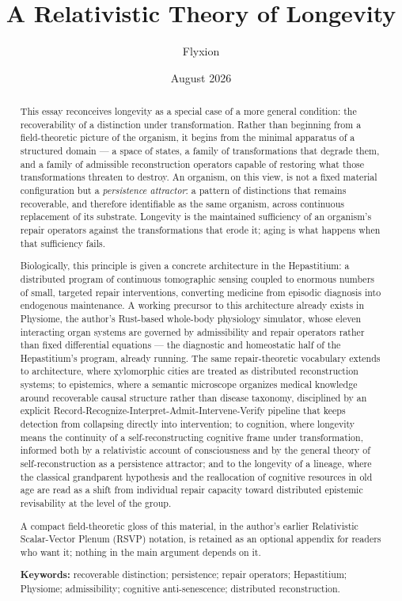 \documentclass[12pt]{article}
\title{A Relativistic Theory of Longevity}
\author{Flyxion}
\date{August 2026}
\begin{document}
\maketitle

\begin{abstract}
This essay reconceives longevity as a special case of a more general condition: the recoverability of a distinction under transformation. Rather than beginning from a field-theoretic picture of the organism, it begins from the minimal apparatus of a structured domain --- a space of states, a family of transformations that degrade them, and a family of admissible reconstruction operators capable of restoring what those transformations threaten to destroy. An organism, on this view, is not a fixed material configuration but a \emph{persistence attractor}: a pattern of distinctions that remains recoverable, and therefore identifiable as the same organism, across continuous replacement of its substrate. Longevity is the maintained sufficiency of an organism's repair operators against the transformations that erode it; aging is what happens when that sufficiency fails.

Biologically, this principle is given a concrete architecture in the Hepastitium: a distributed program of continuous tomographic sensing coupled to enormous numbers of small, targeted repair interventions, converting medicine from episodic diagnosis into endogenous maintenance. A working precursor to this architecture already exists in Physiome, the author's Rust-based whole-body physiology simulator, whose eleven interacting organ systems are governed by admissibility and repair operators rather than fixed differential equations --- the diagnostic and homeostatic half of the Hepastitium's program, already running. The same repair-theoretic vocabulary extends to architecture, where xylomorphic cities are treated as distributed reconstruction systems; to epistemics, where a semantic microscope organizes medical knowledge around recoverable causal structure rather than disease taxonomy, disciplined by an explicit Record-Recognize-Interpret-Admit-Intervene-Verify pipeline that keeps detection from collapsing directly into intervention; to cognition, where longevity means the continuity of a self-reconstructing cognitive frame under transformation, informed both by a relativistic account of consciousness and by the general theory of self-reconstruction as a persistence attractor; and to the longevity of a lineage, where the classical grandparent hypothesis and the reallocation of cognitive resources in old age are read as a shift from individual repair capacity toward distributed epistemic revisability at the level of the group.

A compact field-theoretic gloss of this material, in the author's earlier Relativistic Scalar-Vector Plenum (RSVP) notation, is retained as an optional appendix for readers who want it; nothing in the main argument depends on it.

\medskip
\noindent \textbf{Keywords:} recoverable distinction; persistence; repair operators; Hepastitium; Physiome; admissibility; cognitive anti-senescence; distributed reconstruction.
\end{abstract}
\end{document}
